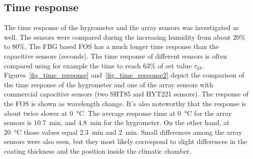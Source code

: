 \begin{table}[!h]
\centering
\caption{Comparison of the temperature and humidity sensitivity obtained through calibration based on different approaches.}
\label{tab:fos}
\end{table}
\subsection{Time response}
The time response of the hygrometer and the array sensors was investigated as well. The sensors were compared during the increasing humidity from about 20\% to 80\%. The \gls{FBG} based \gls{FOS} has a much longer time response than the capacitive sensors (seconds). The time response of different sensors is often compared using for example the time to reach 63\% of set value $\tau_{63}$.
\newpage
Figures~\ref{fig_time_response} and~\ref{fig_time_response2} depict the comparison of the time response of the hygrometer and one of the array sensors with commercial capacitive sensors (two SHT85 and HYT221 sensors). The response of the \gls{FOS} is shown as wavelength change. It's also noteworthy that the response is about twice slower at \SI{0}{\celsius}. The average response time at \SI{0}{\celsius} for the array sensors is $10.7$~min, and $4.8$~min for the hygrometer. On the other hand, at \SI{20}{\celsius} those values equal $2.3$~min and $2$~min. Small differences among the array sensors were also seen, but they most likely correspond to slight differences in the coating thickness and the position inside the climatic chamber. 

